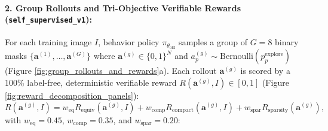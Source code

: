 \documentclass[11pt,a4paper]{article}
\begin{document}
\paragraph{2. Group Rollouts and Tri-Objective Verifiable Rewards (\texttt{self\_supervised\_v1}):}
For each training image $I$, behavior policy $\pi_{\theta_{\text{old}}}$ samples a group of $G=8$ binary masks $\{\mathbf{a}^{(1)}, \dots, \mathbf{a}^{(G)}\}$ where $\mathbf{a}^{(g)} \in \{0, 1\}^N$ and $a_p^{(g)} \sim \text{Bernoulli}(p_p^{\text{explore}})$ (Figure \ref{fig:group_rollouts_and_rewards}a). Each rollout $\mathbf{a}^{(g)}$ is scored by a 100\% label-free, deterministic verifiable reward $R(\mathbf{a}^{(g)}, I) \in [0, 1]$ (Figure \ref{fig:reward_decomposition_panels}):
\begin{equation}
R(\mathbf{a}^{(g)}, I) = w_{\text{eq}} R_{\text{equiv}}(\mathbf{a}^{(g)}, I) + w_{\text{comp}} R_{\text{compact}}(\mathbf{a}^{(g)}, I) + w_{\text{spar}} R_{\text{sparsity}}(\mathbf{a}^{(g)}),
\label{eq:composite_reward}
\end{equation}
with $w_{\text{eq}} = 0.45$, $w_{\text{comp}} = 0.35$, and $w_{\text{spar}} = 0.20$:
\end{document}

